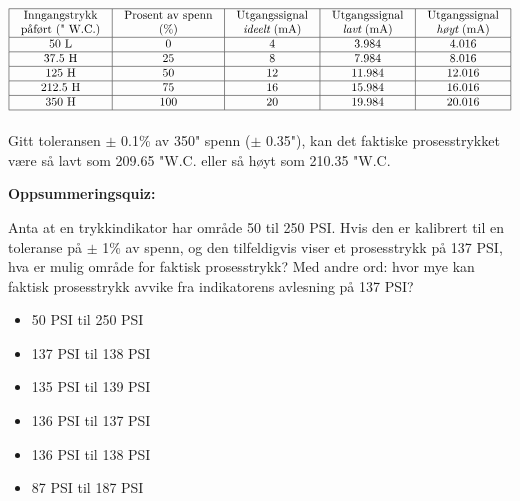 

$$\vbox{\offinterlineskip
\halign{\strut
\vrule \quad\hfil # \ \hfil & 
\vrule \quad\hfil # \ \hfil & 
\vrule \quad\hfil # \ \hfil & 
\vrule \quad\hfil # \ \hfil & 
\vrule \quad\hfil # \ \hfil \vrule \cr
\noalign{\hrule}
%
Inngangstrykk & Prosent av spenn & Utgangssignal & Utgangssignal & Utgangssignal \cr
%
påført (" W.C.) & (\%) & {\it ideelt} (mA) & {\it lavt} (mA) & {\it høyt} (mA) \cr
%
\noalign{\hrule}
%
50 L & 0 & 4 & 3.984 & 4.016 \cr
%
\noalign{\hrule}
%
37.5 H & 25 & 8 & 7.984 & 8.016 \cr
%
\noalign{\hrule}
%
125 H & 50 & 12 & 11.984 & 12.016 \cr
%
\noalign{\hrule}
%
212.5 H & 75 & 16 & 15.984 & 16.016 \cr
%
\noalign{\hrule}
%
350 H & 100 & 20 & 19.984 & 20.016 \cr
%
\noalign{\hrule}
} %
}$$ %


Gitt toleransen $\pm$ 0.1\% av 350" spenn ($\pm$ 0.35"), kan det faktiske prosesstrykket være så lavt som 209.65 "W.C. eller så høyt som 210.35 "W.C.













\vfil \eject

\noindent
{\bf Oppsummeringsquiz:}

Anta at en trykkindikator har område 50 til 250 PSI.  Hvis den er kalibrert til en toleranse på $\pm$ 1\% av spenn, og den tilfeldigvis viser et prosesstrykk på 137 PSI, hva er mulig område for faktisk prosesstrykk?  Med andre ord: hvor mye kan faktisk prosesstrykk avvike fra indikatorens avlesning på 137 PSI?

\begin{itemize}
\item{} 50 PSI til 250 PSI
\vskip 5pt 
\item{} 137 PSI til 138 PSI
\vskip 5pt 
\item{} 135 PSI til 139 PSI
\vskip 5pt 
\item{} 136 PSI til 137 PSI
\vskip 5pt 
\item{} 136 PSI til 138 PSI
\vskip 5pt 
\item{} 87 PSI til 187 PSI
\end{itemize}



